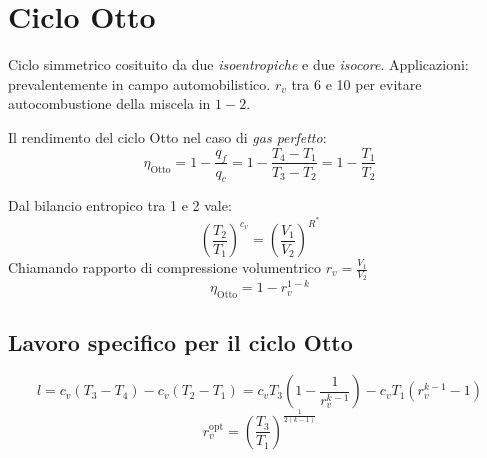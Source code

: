 \section{Ciclo Otto}
Ciclo simmetrico cosituito da due \emph{isoentropiche} e due \emph{isocore}.
Applicazioni: prevalentemente in campo automobilistico. $r_v$ tra 6 e 10 per evitare autocombustione della miscela in $1-2$.

\begin{minipage}{.5\linewidth}
\end{minipage}%
\begin{minipage}{.5\linewidth}
\end{minipage}

Il rendimento del ciclo Otto nel caso di \emph{gas perfetto}:
\[
    \eta_{\text{Otto}} = 1 - \frac{q_f}{q_c} = 1 - \frac{T_4-T_1}{T_3-T_2} = 1 - \frac{T_1}{T_2}
\]

Dal bilancio entropico tra 1 e 2 vale:
\[
    \left( \frac{T_2}{T_1} \right)^{c_v} = \left( \frac{V_1}{V_2} \right)^{R^*} 
\]
Chiamando rapporto di compressione volumentrico $r_v = \frac{V_1}{V_2}$
\[
    \eta_{\text{Otto}} = 1 - r_v^{1-k}
\]

\subsection{Lavoro specifico per il ciclo Otto}
\[
    l = c_v(T_3-T_4) - c_v(T_2-T_1) = c_vT_3\left(1-\frac{1}{r_v^{k-1}}\right) - c_vT_1(r_v^{k-1}-1)
\]
\[
    r_v^{\text{opt}} = \left(\frac{T_3}{T_1}\right)^{\frac{1}{2(k-1)}}
\]
